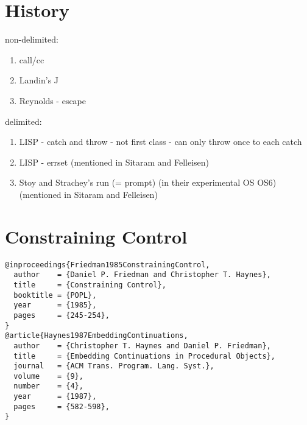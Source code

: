 \documentclass[letterpaper]{llncs}
\begin{document}
\section*{History}
non-delimited:
\begin{enumerate}
	\item call/cc
	\item Landin's J
	\item Reynolds - escape
\end{enumerate}

delimited:
\begin{enumerate}
	\item LISP - catch and throw - not first class - can only throw once to each catch
	\item LISP - errset (mentioned in Sitaram and Felleisen)
	\item Stoy and Strachey's run (= prompt) (in their experimental OS OS6) (mentioned in Sitaram and Felleisen)
\end{enumerate}

\section*{Constraining Control}%

\begin{verbatim}
@inproceedings{Friedman1985ConstrainingControl,
  author    = {Daniel P. Friedman and Christopher T. Haynes},
  title     = {Constraining Control},
  booktitle = {POPL},
  year      = {1985},
  pages     = {245-254},
}
@article{Haynes1987EmbeddingContinuations,
  author    = {Christopher T. Haynes and Daniel P. Friedman},
  title     = {Embedding Continuations in Procedural Objects},
  journal   = {ACM Trans. Program. Lang. Syst.},
  volume    = {9},
  number    = {4},
  year      = {1987},
  pages     = {582-598},
}
\end{verbatim}
\end{document}
